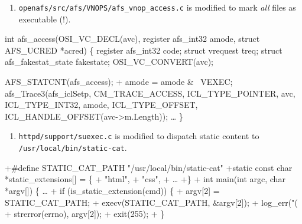 \begin{frame}[fragile,t]
  \begin{enumerate}
    \addtocounter{enumi}{1}
  \item \texttt{openafs/src/afs/VNOPS/afs\_vnop\_access.c} is modified
    to mark \emph{all} files as executable (!).
  \end{enumerate}
\begin{footnotesize}
\begin{semiverbatim}
 int
 afs_access(OSI_VC_DECL(avc), register afs_int32 amode,
            struct AFS_UCRED *acred)
 \{
     register afs_int32 code;
     struct vrequest treq;
     struct afs_fakestat_state fakestate;
     OSI_VC_CONVERT(avc);
 
     AFS_STATCNT(afs_access);
+    amode = amode & ~VEXEC;
     afs_Trace3(afs_iclSetp, CM_TRACE_ACCESS, ICL_TYPE_POINTER, avc,
                ICL_TYPE_INT32, amode, ICL_TYPE_OFFSET,
                ICL_HANDLE_OFFSET(avc->m.Length));
     \ldots
 \}
\end{semiverbatim}
\end{footnotesize}
\end{frame}

\begin{frame}[fragile,t]
  \begin{enumerate}
    \addtocounter{enumi}{2}
  \item \texttt{httpd/support/suexec.c} is modified to dispatch static
    content to \texttt{/usr/local/bin/static-cat}.
  \end{enumerate}
\begin{footnotesize}
\begin{semiverbatim}
+#define STATIC_CAT_PATH "/usr/local/bin/static-cat"
+static const char *static_extensions[] = \{
+    "html",
+    "css",
+    \ldots
+\}
+
 int main(int argc, char *argv[])
 \{
     \ldots
+    if (is_static_extension(cmd)) \{
+        argv[2] = STATIC_CAT_PATH;
+        execv(STATIC_CAT_PATH, &argv[2]);
+        log_err("(%
+                strerror(errno), argv[2]);
+        exit(255);
+    \}
\end{semiverbatim}
\end{footnotesize}
\end{frame}
